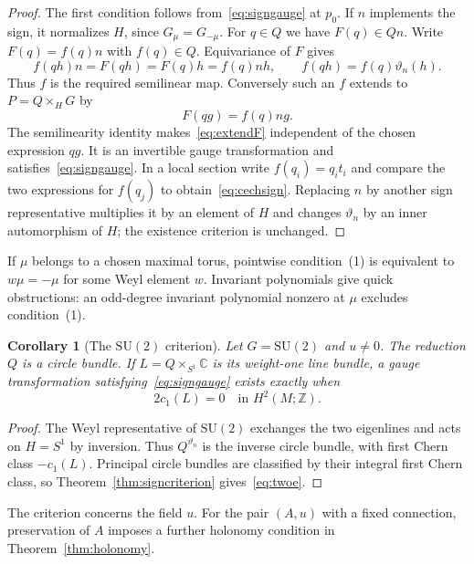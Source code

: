 \documentclass[11pt]{amsart}
\newcommand{\Z}{\mathbb Z}
\newcommand{\C}{\mathbb C}
\theoremstyle{plain}
\newtheorem{corollary}[theorem]{Corollary}
\theoremstyle{definition}
\theoremstyle{remark}
\begin{document}
\begin{proof}
The first condition follows from~\eqref{eq:signgauge} at $p_0$.  If $n$ implements the sign, it normalizes $H$, since $G_\mu=G_{-\mu}$.  For $q\in Q$ we have $F(q)\in Qn$.  Write $F(q)=f(q)n$ with $f(q)\in Q$.  Equivariance of $F$ gives
\[
 f(qh)n=F(qh)=F(q)h=f(q)nh,
 \qquad f(qh)=f(q)\vartheta_n(h).
\]
Thus $f$ is the required semilinear map.  Conversely such an $f$ extends to $P=Q\times_HG$ by
\begin{equation}\label{eq:extendF}
 F(qg)=f(q)ng.
\end{equation}
The semilinearity identity makes~\eqref{eq:extendF} independent of the chosen expression $qg$.  It is an invertible gauge transformation and satisfies~\eqref{eq:signgauge}.  In a local section write $f(q_i)=q_i t_i$ and compare the two expressions for $f(q_j)$ to obtain~\eqref{eq:cechsign}.  Replacing $n$ by another sign representative multiplies it by an element of $H$ and changes $\vartheta_n$ by an inner automorphism of $H$; the existence criterion is unchanged.
\end{proof}

If $\mu$ belongs to a chosen maximal torus, pointwise condition~(1) is equivalent to $w\mu=-\mu$ for some Weyl element $w$.  Invariant polynomials give quick obstructions: an odd-degree invariant polynomial nonzero at $\mu$ excludes condition~(1).

\begin{corollary}[The $\mathrm{SU}(2)$ criterion]\label{cor:su2criterion}
Let $G=\mathrm{SU}(2)$ and $u\ne0$.  The reduction $Q$ is a circle bundle.  If $L=Q\times_{S^1}\C$ is its weight-one line bundle, a gauge transformation satisfying~\eqref{eq:signgauge} exists exactly when
\begin{equation}\label{eq:twoe}
 2c_1(L)=0\quad\text{in }H^2(M;\Z).
\end{equation}
\end{corollary}

\begin{proof}
The Weyl representative of $\mathrm{SU}(2)$ exchanges the two eigenlines and acts on $H=S^1$ by inversion.  Thus $Q^{\vartheta_n}$ is the inverse circle bundle, with first Chern class $-c_1(L)$.  Principal circle bundles are classified by their integral first Chern class, so Theorem~\ref{thm:signcriterion} gives~\eqref{eq:twoe}.
\end{proof}

The criterion concerns the field $u$.  For the pair $(A,u)$ with a fixed connection, preservation of $A$ imposes a further holonomy condition in Theorem~\ref{thm:holonomy}.
\end{document}
